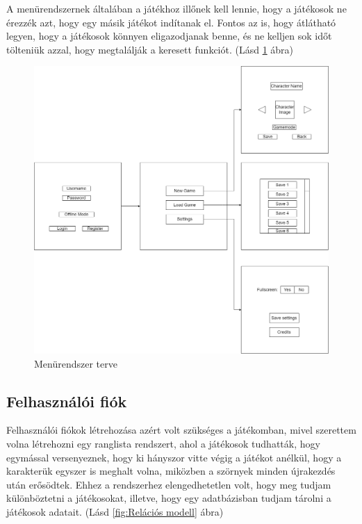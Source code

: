  A menürendszernek általában a játékhoz illőnek kell lennie, hogy a játékosok ne érezzék azt, hogy egy másik játékot indítanak el. Fontos az is, hogy átlátható legyen, hogy a játékosok könnyen eligazodjanak benne, és ne kelljen sok időt tölteniük azzal, hogy megtalálják a keresett funkciót. (Lásd \ref{fig:Menürendszer terve} ábra)

\begin{figure}[H]
    \centering
    \includegraphics[width=14.0truecm]{images/MS_menu.drawio.png}
    \caption{Menürendszer terve}
    \label{fig:Menürendszer terve}
\end{figure}

\subsection{Felhasználói fiók}
 Felhasználói fiókok létrehozása azért volt szükséges a játékomban, mivel szerettem volna létrehozni egy ranglista rendszert, ahol a játékosok tudhatták, hogy egymással versenyeznek, hogy ki hányszor vitte végig a játékot anélkül, hogy a karakterük egyszer is meghalt volna, miközben a szörnyek minden újrakezdés után erősödtek. Ehhez a rendszerhez elengedhetetlen volt, hogy meg tudjam különböztetni a játékosokat, illetve, hogy egy adatbázisban tudjam tárolni a játékosok adatait. (Lásd \ref{fig:Relációs modell} ábra)

